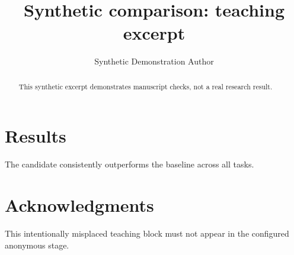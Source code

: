 \documentclass{article}
\author{Synthetic Demonstration Author}
\title{Synthetic comparison: teaching excerpt}
\begin{document}
\maketitle
\begin{abstract}
This synthetic excerpt demonstrates manuscript checks, not a real research result.
\end{abstract}
\section{Results}
The candidate consistently outperforms the baseline across all tasks.
\section*{Acknowledgments}
This intentionally misplaced teaching block must not appear in the configured anonymous stage.
\end{document}
